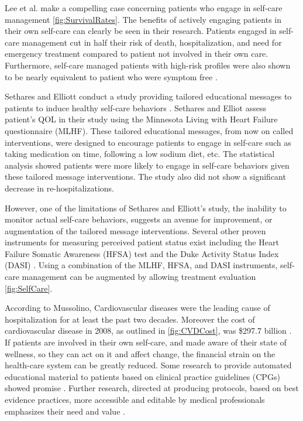 Lee et al. make a compelling case concerning patients who engage in self-care management \cref{fig:SurvivalRates}. \cite{Lee2011} The benefits of actively engaging patients in their own self-care can clearly be seen in their research.   Patients engaged in self-care management cut in half their risk of death, hospitalization, and need for emergency treatment compared to patient not involved in their own care. Furthermore, self-care managed patients with high-risk profiles were also shown to be nearly equivalent to patient who were symptom free \cite{Lee2011}.

Sethares and Elliott conduct a study providing tailored educational messages to patients to induce healthy self-care behaviors \cite{Sethares2004249}. Sethares and Elliot assess patient's QOL in their study using the Minnesota Living with Heart Failure questionnaire (MLHF). These tailored educational messages, from now on called interventions, were designed to encourage patients to engage in self-care such as taking medication on time, following a low sodium diet, etc. The statistical analysis showed patients were more likely to engage in self-care behaviors given these tailored message interventions. The study also did not show a significant decrease in re-hospitalizations. 


However, one of the limitations of Sethares and Elliott's study, the inability to monitor actual self-care behaviors, suggests an avenue for improvement, or augmentation of the tailored message interventions. Several other proven instruments for measuring perceived patient status exist including the Heart Failure Somatic Awareness (HFSA) \cite{Jurgens2006} test and the Duke Activity Status Index (DASI) \cite{Hlatky1989}. Using a combination of the MLHF, HFSA, and DASI instruments, self-care management can be augmented by allowing treatment evaluation \cref{fig:SelfCare}.   

According to Mussolino, Cardiovascular diseases were the leading cause of hospitalization for at least the past two decades. Moreover the cost of cardiovascular disease in 2008, as outlined in \cref{fig:CVDCost}, was \$297.7 billion \cite{Mussolino2012}. If patients are involved in their own self-care, and made aware of their state of wellness, so they can act on it and affect change, the financial strain on the health-care system can be greatly reduced. Some research to provide automated educational material to patients based on clinical practice guidelines (CPGs) showed promise \cite{Jones2005}. Further research, directed at producing protocols, based on best evidence practices, more accessible and editable by medical professionals emphasizes their need and value \cite{Shah2001}.


